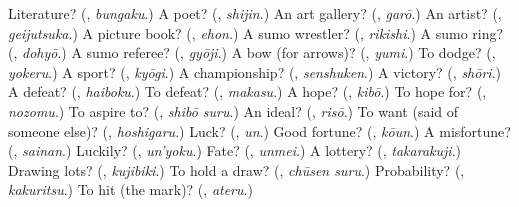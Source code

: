 \begin{tcolorbox}[breakable,colback=teal!4,colframe=teal!35!black,title={Before you move on}]
Literature? (\textbf{}, \emph{bungaku}.) A poet? (\textbf{}, \emph{shijin}.) An art gallery? (\textbf{}, \emph{garō}.) An artist? (\textbf{}, \emph{geijutsuka}.) A picture book? (\textbf{}, \emph{ehon}.) A sumo wrestler? (\textbf{}, \emph{rikishi}.) A sumo ring? (\textbf{}, \emph{dohyō}.) A sumo referee? (\textbf{}, \emph{gyōji}.) A bow (for arrows)? (\textbf{}, \emph{yumi}.) To dodge? (\textbf{}, \emph{yokeru}.) A sport? (\textbf{}, \emph{kyōgi}.) A championship? (\textbf{}, \emph{senshuken}.) A victory? (\textbf{}, \emph{shōri}.) A defeat? (\textbf{}, \emph{haiboku}.) To defeat? (\textbf{}, \emph{makasu}.) A hope? (\textbf{}, \emph{kibō}.) To hope for? (\textbf{}, \emph{nozomu}.) To aspire to? (\textbf{}, \emph{shibō suru}.) An ideal? (\textbf{}, \emph{risō}.) To want (said of someone else)? (\textbf{}, \emph{hoshigaru}.) Luck? (\textbf{}, \emph{un}.) Good fortune? (\textbf{}, \emph{kōun}.) A misfortune? (\textbf{}, \emph{sainan}.) Luckily? (\textbf{}, \emph{un'yoku}.) Fate? (\textbf{}, \emph{unmei}.) A lottery? (\textbf{}, \emph{takarakuji}.) Drawing lots? (\textbf{}, \emph{kujibiki}.) To hold a draw? (\textbf{}, \emph{chūsen suru}.) Probability? (\textbf{}, \emph{kakuritsu}.) To hit (the mark)? (\textbf{}, \emph{ateru}.)
\end{tcolorbox}
